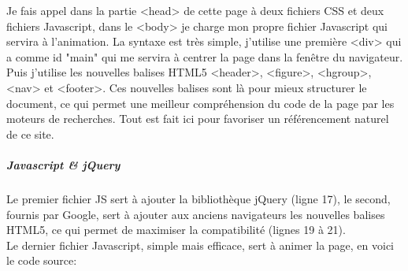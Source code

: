 \documentclass[11pt,a4paper]{report}
\begin{document}
					Je fais appel dans la partie <head> de cette page à deux fichiers CSS et deux fichiers Javascript, dans le <body> je charge mon propre fichier Javascript qui servira à l'animation. La syntaxe est très simple, j'utilise une première <div> qui a comme id "main" qui me servira à centrer la page dans la fenêtre du navigateur. Puis j'utilise les nouvelles balises HTML5 <header>, <figure>, <hgroup>, <nav> et <footer>. Ces nouvelles balises sont là pour mieux structurer le document, ce qui permet une meilleur compréhension du code de la page par les moteurs de recherches. Tout est fait ici pour favoriser un référencement naturel de ce site.

				\subparagraph{Javascript \& jQuery}Le premier fichier JS sert à ajouter la bibliothèque jQuery (ligne 17), le second, fournis par Google, sert à ajouter aux anciens navigateurs les nouvelles balises HTML5, ce qui permet de maximiser la compatibilité (lignes 19 à 21).\\
				Le dernier fichier Javascript, simple mais efficace, sert à animer la page, en voici le code source:
\end{document}
